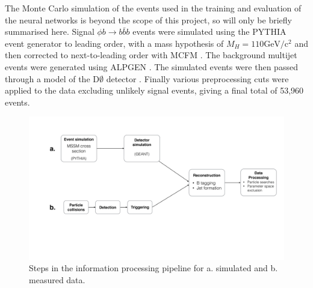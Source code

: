 
The Monte Carlo simulation of the events used in the training and evaluation of the neural networks is beyond the scope of this project, so will only be briefly summarised here. Signal $\phi b \rightarrow b\bar{b}b $ events were simulated using the PYTHIA event generator \cite{sjostrand2006pythia} to leading order, with a mass hypothesis  of $M_H = 110 \mathrm{GeV/c^2}$ and then corrected to next-to-leading order with MCFM \cite{campbell2010mcfm}. 
The background multijet events were generated using ALPGEN \cite{mangano2003alpgen}. The simulated events were then passed through a model of the D$\emptyset$ detector \cite{brun1993geant}.
Finally various preprocessing cuts were applied to the data excluding unlikely signal events, giving a final total of 53,960 events.


\begin{figure}[htbp]
	\centering
		\includegraphics[width=\textwidth]{img/flow}
	\caption{Steps in the information processing pipeline for a. simulated and b. measured data.  }
	\label{fig:flow}
\end{figure}